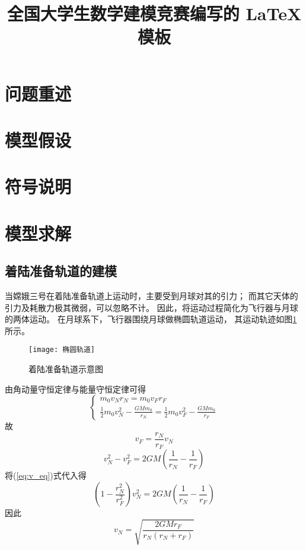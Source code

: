 \documentclass[withoutpreface,bwprint]{cumcmthesis} %
\title{全国大学生数学建模竞赛编写的 \LaTeX{} 模板}
\begin{document}
    \maketitle
    \begin{abstract}

    \end{abstract}

    \section{问题重述}
    \section{模型假设}
    \section{符号说明}
    \section{模型求解}
    \subsection{着陆准备轨道的建模}
    当嫦娥三号在着陆准备轨道上运动时，主要受到月球对其的引力；
    而其它天体的引力及耗散力极其微弱，可以忽略不计。
    因此，将运动过程简化为飞行器与月球的两体运动。
    在月球系下，飞行器围绕月球做椭圆轨道运动，
    其运动轨迹如图\ref{fig:tuo_yuan_gui_dao}所示。
    \begin{figure}[!h]
        \centering
        \texttt{[image: 椭圆轨道]}
        \caption{着陆准备轨道示意图}
        \label{fig:tuo_yuan_gui_dao}
    \end{figure}


    由角动量守恒定律与能量守恒定律可得
    \begin{equation}
        \begin{cases}
            m_0 v_Nr_N = m_0v_Fr_F \\
            \frac{1}{2} m_0 v_N^2 - \frac{GMm_0}{r_N} = \frac{1}{2} m_0 v_F^2 - \frac{GMm_0}{r_F}
        \end{cases}
    \end{equation}
    故
    \begin{equation}
        v_F = \frac{r_N}{r_F} v_N
        \label{eq:v_eq}
    \end{equation}
    \begin{equation*}
        v_N^2 - v_F^2 = 2GM(\frac{1}{r_N} - \frac{1}{r_F})
    \end{equation*}
    将(\ref{eq:v_eq})式代入得
    \begin{equation*}
        (1 - \frac{r_N^2}{r_F^2})v_N^2 = 2GM(\frac{1}{r_N} - \frac{1}{r_F})
    \end{equation*}
    因此
    \begin{equation}
        \boxed{
            v_N = \sqrt{\frac{2GMr_F}{r_N(r_N + r_F)}}
        }
    \end{equation}
\end{document}
